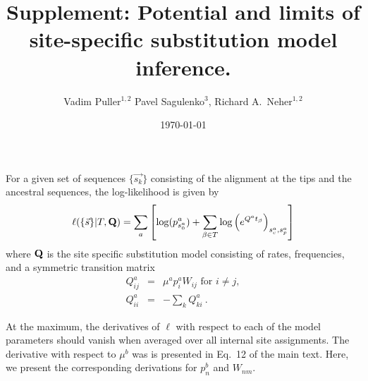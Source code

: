 \documentclass[aps,rmp,onecolumn]{revtex4}
\newcommand{\mat}[1]{{\bf #1}}
\newcommand{\eqp}{p}
\newcommand{\lh}{\ell}
\begin{document}
\title{Supplement: Potential and limits of site-specific substitution model inference.}
\author{Vadim Puller$^{1,2}$ Pavel Sagulenko$^{3}$, Richard A.~Neher$^{1,2}$}

\date{\today}
\maketitle

For a given set of sequences $\{\vec{s_k}\}$ consisting of the alignment at the tips and the ancestral sequences, the log-likelihood is given by
\begin{equation}
	\label{eq:logLH}
	\lh(\{\vec{s}\} |T, \mat{Q}) = \sum_a \left[\log(\eqp^a_{s^{a}_0}) + \sum_{\beta\in T} \log\left( e^{Q^at_\beta} \right)_{s^a_c, s^a_p}\right]
\end{equation}
where $\mat{Q}$ is the site specific substitution model consisting of rates, frequencies, and a symmetric transition matrix
\begin{eqnarray}
Q^{a}_{ij} &=& \mu^{a}\eqp^{a}_{i} W_{ij} \textrm{ for } i\neq j,\nonumber \\
Q^{a}_{ii} &=& -\sum_k Q^{a}_{ki} \ .
\label{eq:Qij_supp}
\end{eqnarray}

At the maximum, the derivatives of $\lh$ with respect to each of the model parameters should vanish when averaged over all internal site assignments.
The derivative with respect to $\mu^b$ was is presented in Eq.~12 of the main text.
Here, we present the corresponding derivations for $\eqp^b_n$ and $W_{nm}$.
\end{document}
